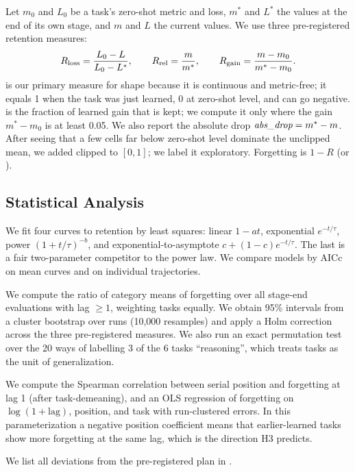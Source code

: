 Let $m_0$ and $L_0$ be a task's zero-shot metric and loss, $m^*$ and $L^*$ the values at the end of its own stage, and $m$ and $L$ the current values.
We use three pre-registered retention measures:
\begin{equation}
    R_{\mathrm{loss}} = \frac{L_0 - L}{L_0 - L^*}, \qquad
    R_{\mathrm{rel}} = \frac{m}{m^*}, \qquad
    R_{\mathrm{gain}} = \frac{m - m_0}{m^* - m_0}.
\end{equation}
\rloss is our primary measure for shape because it is continuous and metric-free; it equals 1 when the task was just learned, 0 at zero-shot level, and can go negative.
\rgain is the fraction of learned gain that is kept; we compute it only where the gain $m^* - m_0$ is at least 0.05.
We also report the absolute drop $\textit{abs\_drop} = m^* - m$.
After seeing that a few cells far below zero-shot level dominate the unclipped mean, we added \rloss clipped to $[0, 1]$; we label it exploratory.
Forgetting is $1 - R$ (or \absdrop).

\subsection{Statistical Analysis}

We fit four curves to retention by least squares: linear $1 - at$, exponential $e^{-t/\tau}$, power $(1 + t/\tau)^{-b}$, and exponential-to-asymptote $c + (1-c)e^{-t/\tau}$.
The last is a fair two-parameter competitor to the power law.
We compare models by AICc on mean curves and on individual trajectories.

We compute the ratio of category means of forgetting over all stage-end evaluations with lag $\geq 1$, weighting tasks equally.
We obtain 95\% intervals from a cluster bootstrap over runs (10{,}000 resamples) and apply a Holm correction~\cite{holm1979simple} across the three pre-registered measures.
We also run an exact permutation test over the 20 ways of labelling 3 of the 6 tasks ``reasoning'', which treats tasks as the unit of generalization.

We compute the Spearman correlation between serial position and forgetting at lag 1 (after task-demeaning), and an OLS regression of forgetting on $\log(1 + \text{lag})$, position, and task with run-clustered errors.
In this parameterization a negative position coefficient means that earlier-learned tasks show more forgetting at the same lag, which is the direction H3 predicts.

We list all deviations from the pre-registered plan in .
